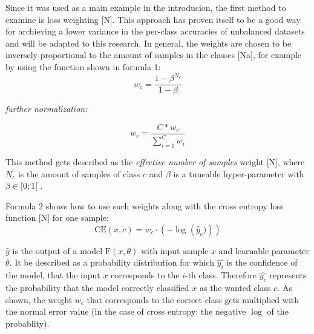 \documentclass[journal]{IEEEtran}
\begin{document}
Since it was used as a main example in the introducion, the first method to examine is loss weighting [N]. 
This approach has proven itself to be a good way for archieving a lower variance in the per-class accuracies of unbalanced datasets and will be adapted to this research. 
In general, the weights are chosen to be inversely proportional to the amount of samples in the classes [Na], for example by using the function shown in forumla 1:
\[ w_c = \frac{1-\beta^{N_c}}{1-\beta} \]

\emph{further normalization:}

\[ w_c = \frac{C * w_c}{\sum_{i=1}^{C}w_i} \]

This method gets described as the \emph{effective number of samples} weight [N], where $N_c$ is the amount of samples of class $c$ and $\beta$ is a tuneable hyper-parameter with $\beta \in [0;1[$ .

Formula 2 shows how to use such weights along with the cross entropy loss function [N] for one sample:
\[ \text{CE}(x, c) = w_{c} \cdot \left(-\log\left(\hat{y}_c)\right) \right) \]



$\hat{y}$ is the output of a model $\text{F}(x, \theta)$ with input sample $x$ and learnable parameter $\theta$. 
It be described as a probability distribution for which $\hat{y_i}$ is the confidence of the model, that the input $x$ corresponds to the $i$-th class.
Therefore $\hat{y_c}$ represents the probability that the model correctly classified $x$ as the wanted class $c$. 
As shown, the weight $w_c$ that corresponds to the correct class gets multiplied with the normal error value (in the case of cross entropy: the negative $\log$ of the probablity).

\end{document}
